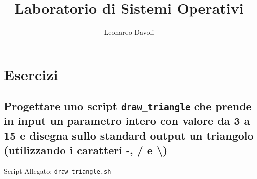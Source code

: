 \documentclass{article}
\author{Leonardo Davoli}
\title{Laboratorio di Sistemi Operativi}
\begin{document}
\maketitle

\setcounter{section}{3} %
\section{Esercizi}

\subsection{Progettare uno script \texttt{draw\_triangle} che prende in input un parametro intero con valore da 3 a 15 
e disegna sullo standard output un triangolo (utilizzando i caratteri -, / e \textbackslash)}

Script Allegato: \texttt{draw_triangle.sh}
\end{document}
